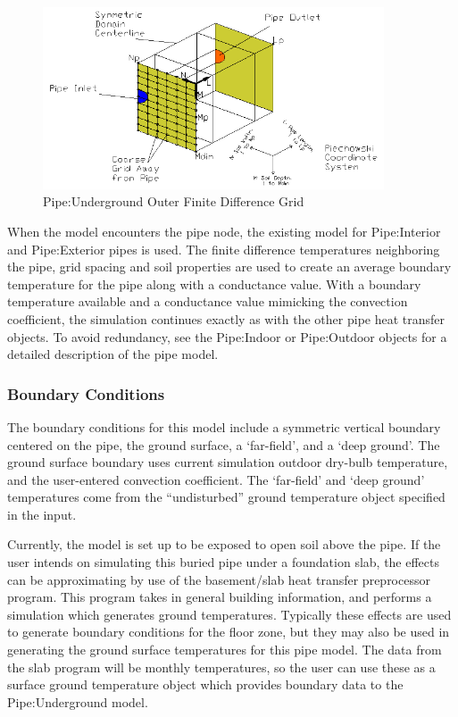 \begin{figure}[hbtp] %
\centering
\includegraphics[width=0.9\textwidth, height=0.9\textheight, keepaspectratio=true]{media/image5851.png}
\caption{Pipe:Underground Outer Finite Difference Grid \protect \label{fig:pipe-underground-outer-finite-difference-grid}}
\end{figure}

When the model encounters the pipe node, the existing model for Pipe:Interior and Pipe:Exterior pipes is used. The finite difference temperatures neighboring the pipe, grid spacing and soil properties are used to create an average boundary temperature for the pipe along with a conductance value. With a boundary temperature available and a conductance value mimicking the convection coefficient, the simulation continues exactly as with the other pipe heat transfer objects. To avoid redundancy, see the Pipe:Indoor or Pipe:Outdoor objects for a detailed description of the pipe model.

\subsubsection{Boundary Conditions}\label{boundary-conditions-000}

The boundary conditions for this model include a symmetric vertical boundary centered on the pipe, the ground surface, a `far-field', and a `deep ground'. The ground surface boundary uses current simulation outdoor dry-bulb temperature, and the user-entered convection coefficient. The `far-field' and `deep ground' temperatures come from the ``undisturbed'' ground temperature object specified in the input.

Currently, the model is set up to be exposed to open soil above the pipe. If the user intends on simulating this buried pipe under a foundation slab, the effects can be approximating by use of the basement/slab heat transfer preprocessor program. This program takes in general building information, and performs a simulation which generates ground temperatures. Typically these effects are used to generate boundary conditions for the floor zone, but they may also be used in generating the ground surface temperatures for this pipe model. The data from the slab program will be monthly temperatures, so the user can use these as a surface ground temperature object which provides boundary data to the Pipe:Underground model.

